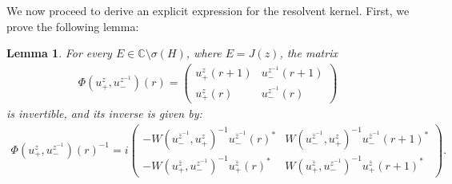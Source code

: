 \documentclass[12pt,oneside,onecolumn,open]{article}
\newtheorem{lema}[teo]{Lemma}
\begin{document}
We now proceed to derive an explicit expression for the resolvent kernel. First, we prove the following lemma:
\begin{lema}\label{aaaa}
    For every $E \in \mathbb{C}\setminus \sigma(H)$, where $E = J(z)$, the matrix
    \begin{align}\label{aaa}
        \Phi(u_+^z, u_-^{z^{-1}})(r) = 
        \begin{pmatrix}
            u_+^z(r+1) & u_-^{z^{-1}}(r+1) \\
            u_+^z(r) & u_-^{z^{-1}}(r)
        \end{pmatrix}
    \end{align}
    is invertible, and its inverse is given by:
    \begin{align}
        \Phi(u_+^z, u_-^{z^{-1}})(r)^{-1} = 
       i \begin{pmatrix}
            -W(u_-^{\overline{z}^{-1}}, u_+^z)^{-1} u_-^{\overline{z}^{-1}}(r)^* 
            & W(u_-^{\overline{z}^{-1}}, u_+^z)^{-1} u_-^{\overline{z}^{-1}}(r+1)^* \\
            -W(u_+^{\overline{z}}, u_-^{z^{-1}})^{-1} u_+^{\overline{z}}(r)^* 
            & W(u_+^{\overline{z}}, u_-^{z^{-1}})^{-1} u_+^{\overline{z}}(r+1)^*
        \end{pmatrix}.
    \end{align}
\end{lema}
\end{document}
